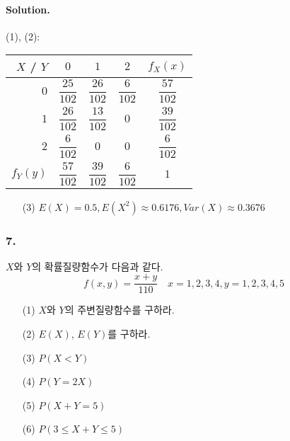 \paragraph{Solution.} (1), (2):

\begin{center}
	\begin{tabular}{r|c|c|c|c}
		$X$ / $Y$ & $0$ & $1$ & $2$ & $f_X\left(x\right)$ \\
		\hline
		$0$ & $\dfrac{25}{102}$ & $\dfrac{26}{102}$ & $\dfrac{6}{102}$ & $\dfrac{57}{102}$ \\
		\hline
		$1$ & $\dfrac{26}{102}$ & $\dfrac{13}{102}$ & $0$ & $\dfrac{39}{102}$ \\
		\hline
		$2$ & $\dfrac{6}{102}$ & $0$ & $0$ & $\dfrac{6}{102}$ \\
		\hline
		$f_Y\left(y\right)$ & $\dfrac{57}{102}$ & $\dfrac{39}{102}$ & $\dfrac{6}{102}$ & $1$ \\
	\end{tabular}
\end{center}

\begin{itemize}
  \item [(3)] $E\left(X\right) = 0.5, E\left(X^2\right) \approx 0.6176, Var\left(X\right) \approx 0.3676$
\end{itemize}

\subsubsection{7.} $X$와 $Y$의 확률질량함수가 다음과 같다. \[f\left(x, y\right) = \dfrac{x+y}{110} \quad x = 1, 2, 3, 4, y = 1, 2, 3, 4, 5\]

\begin{itemize}
  \item [(1)] $X$와 $Y$의 주변질량함수를 구하라.
  \item [(2)] $E\left(X\right)$, $E\left(Y\right)$를 구하라.
  \item [(3)] $P\left(X<Y\right)$
  \item [(4)] $P\left(Y=2X\right)$
  \item [(5)] $P\left(X+Y=5\right)$
  \item [(6)] $P\left(3\leq X+Y\leq 5\right)$
\end{itemize}


